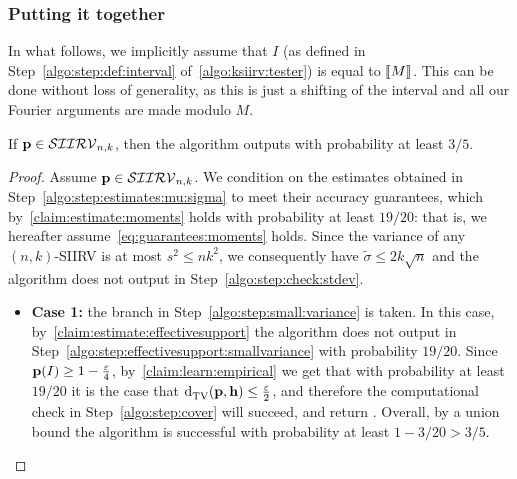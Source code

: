 \subsubsection{Putting it together}

In what follows, we implicitly assume that $I$ (as defined in Step~\ref{algo:step:def:interval} of~\cref{algo:ksiirv:tester}) is equal to $\modulo{M}$. This can be done without loss of generality, as this is just a shifting of the interval and all our Fourier arguments are made modulo $M$.

\begin{lemma}\label{lemma:completeness}
  If $\p \in \classksiirv[n]{k}$, then the algorithm outputs \accept with probability at least $3/5$.
\end{lemma}
\begin{proof}
Assume $\p \in \classksiirv[n]{k}$. We condition on the estimates obtained in Step~\ref{algo:step:estimates:mu:sigma} to meet their accuracy guarantees, which by~\cref{claim:estimate:moments} holds with probability at least $19/20$: that is, we hereafter assume~\cref{eq:guarantees:moments} holds. Since the variance of any $(n,k)$-SIIRV is at most $s^2 \leq n k^2$, we consequently have $\widetilde{\sigma} \leq 2k\sqrt{n}$ and the algorithm does not output \reject in Step~\ref{algo:step:check:stdev}.

\begin{itemize}
\item \textbf{Case 1:} the branch in Step~\ref{algo:step:small:variance} is taken.
In this case, by~\cref{claim:estimate:effectivesupport} the algorithm does not output \reject in Step~\ref{algo:step:effectivesupport:smallvariance} with probability $19/20$. Since $\p(I)\geq 1-\frac{\eps}{4}$, by~\cref{claim:learn:empirical} we get that with probability at least $19/20$ it is the case that $\totalvardist{\p}{\h}\leq \frac{\eps}{2}$, and therefore the computational check in Step~\ref{algo:step:cover} will succeed, and return \accept. Overall, by a union bound the algorithm is successful with probability at least $1-3/20>3/5$.


\end{itemize}
\end{proof}
